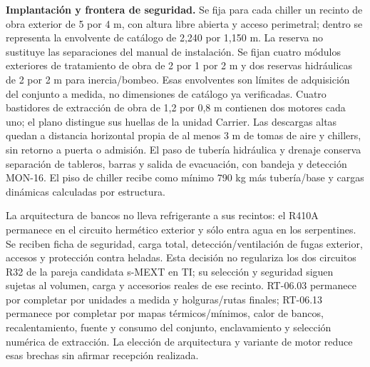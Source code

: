 \textbf{Implantación y frontera de seguridad.} Se fija para cada chiller un recinto de obra exterior de 5 por 4 m, con altura libre abierta y acceso perimetral; dentro se representa la envolvente de catálogo de 2,240 por 1,150 m. La reserva no sustituye las separaciones del manual de instalación. Se fijan cuatro módulos exteriores de tratamiento de obra de 2 por 1 por 2 m y dos reservas hidráulicas de 2 por 2 m para inercia/bombeo. Esas envolventes son límites de adquisición del conjunto a medida, no dimensiones de catálogo ya verificadas. Cuatro bastidores de extracción de obra de 1,2 por 0,8 m contienen dos motores cada uno; el plano distingue sus huellas de la unidad Carrier. Las descargas altas quedan a distancia horizontal propia de al menos 3 m de tomas de aire y chillers, sin retorno a puerta o admisión. El paso de tubería hidráulica y drenaje conserva separación de tableros, barras y salida de evacuación, con bandeja y detección MON-16. El piso de chiller recibe como mínimo 790 kg más tubería/base y cargas dinámicas calculadas por estructura.

La arquitectura de bancos no lleva refrigerante a sus recintos: el R410A permanece en el circuito hermético exterior y sólo entra agua en los serpentines. Se reciben ficha de seguridad, carga total, detección/ventilación de fugas exterior, accesos y protección contra heladas. Esta decisión no regulariza los dos circuitos R32 de la pareja candidata s-MEXT en TI; su selección y seguridad siguen sujetas al volumen, carga y accesorios reales de ese recinto. RT-06.03 permanece por completar por unidades a medida y holguras/rutas finales; RT-06.13 permanece por completar por mapas térmicos/mínimos, calor de bancos, recalentamiento, fuente y consumo del conjunto, enclavamiento y selección numérica de extracción. La elección de arquitectura y variante de motor reduce esas brechas sin afirmar recepción realizada.
